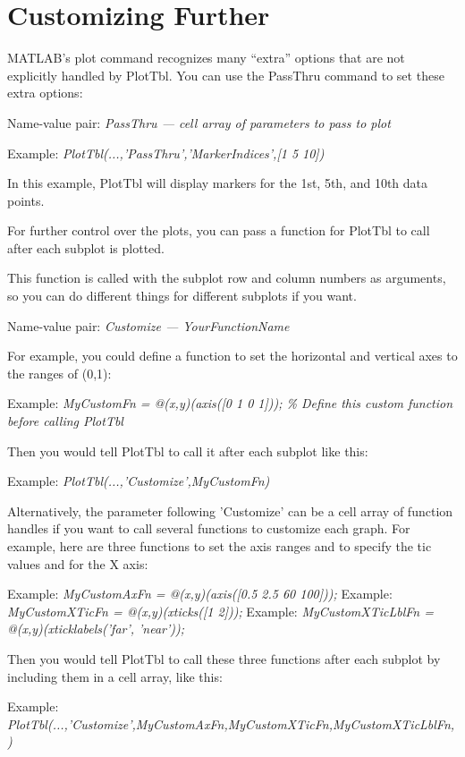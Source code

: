 \documentclass{article}
\newcommand{\example}[1]{Example: {\it #1}}
\newcommand{\namevalue}[2]{{\it #1 --- #2}}
\begin{document}
\section{Customizing Further}  %

MATLAB's plot command recognizes many ``extra'' options that are not explicitly handled by PlotTbl.
You can use the PassThru command to set these extra options:

Name-value pair: \namevalue{PassThru}{cell array of parameters to pass to plot}

\example{PlotTbl(...,'PassThru',{'MarkerIndices',[1 5 10]})}

In this example, PlotTbl will display markers for the 1st, 5th, and 10th data points.

For further control over the plots, you can pass a function for PlotTbl to
call after each subplot is plotted.

This function is called with the subplot row and column numbers as arguments,
so you can do different things for different subplots if you want.

Name-value pair: \namevalue{Customize}{YourFunctionName}

For example, you could define a function to set the horizontal and vertical
axes to the ranges of (0,1):

\example{MyCustomFn = @(x,y)(axis([0 1 0 1])); \% Define this custom function before calling PlotTbl}

Then you would tell PlotTbl to call it after each subplot like this:

\example{PlotTbl(...,'Customize',MyCustomFn)}

Alternatively, the parameter following 'Customize' can be a cell array of function handles
if you want to call several functions to customize each graph.
For example, here are three functions to set the axis ranges and to specify the tic values and for the X axis:

\example{MyCustomAxFn = @(x,y)(axis([0.5 2.5 60 100]));}
\example{MyCustomXTicFn = @(x,y)(xticks([1 2]));}
\example{MyCustomXTicLblFn = @(x,y)(xticklabels({'far', 'near'}));}

Then you would tell PlotTbl to call these three functions after each subplot by including them
in a cell array, like this:

\example{PlotTbl(...,'Customize',{MyCustomAxFn,MyCustomXTicFn,MyCustomXTicLblFn,})}
\end{document}
